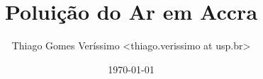 \documentclass{beamer}
\begin{document}
  \title{Poluição do Ar em Accra}
  \author{Thiago Gomes Veríssimo <thiago.verissimo at usp.br> }
  \date{\today}

\begin{frame}
  \titlepage
\end{frame}

\begin{frame}
  \tableofcontents
\end{frame}


\end{document}
